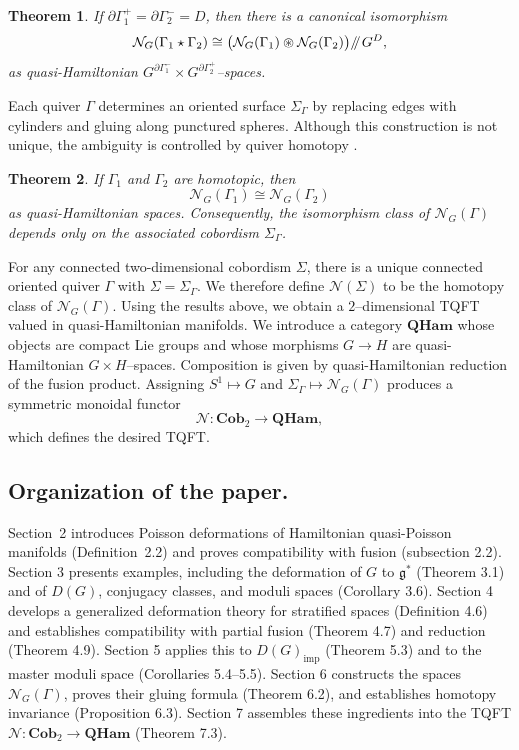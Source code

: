 \documentclass[reqno]{amsart}
\theoremstyle{plain}
\newtheorem{Thm}{Theorem}[section]
\theoremstyle{definition}
\newcommand{\sll}[1]{\mkern-4mu\mathbin{/\mkern-5mu/}_{\mkern-4mu{#1}}}
\begin{document}
\begin{Thm}
If $\partial\Gamma_{1}^{+}=\partial\Gamma_{2}^{-}=D$, then there is a canonical isomorphism
\[
\mathcal{N}_{G}(\Gamma_{1}\star\Gamma_{2})
\cong
\bigl(\mathcal{N}_{G}(\Gamma_{1})\circledast\mathcal{N}_{G}(\Gamma_{2})\bigr)\sll{} G^{D},
\]
as quasi-Hamiltonian $G^{\partial\Gamma_{1}^{-}}\times G^{\partial\Gamma_{2}^{+}}$--spaces.
\end{Thm}

Each quiver $\Gamma$ determines an oriented surface $\Sigma_{\Gamma}$ by replacing edges with cylinders and gluing along punctured spheres. Although this construction is not unique, the ambiguity is controlled by quiver homotopy \cite[Definition~6.1, Proposition~6.2]{maiza2025lax}.

\begin{Thm}
If $\Gamma_{1}$ and $\Gamma_{2}$ are homotopic, then
\[
\mathcal{N}_{G}(\Gamma_{1})\cong \mathcal{N}_{G}(\Gamma_{2})
\]
as quasi-Hamiltonian spaces. Consequently, the isomorphism class of $\mathcal{N}_{G}(\Gamma)$ depends only on the associated cobordism $\Sigma_{\Gamma}$.
\end{Thm}

For any connected two-dimensional cobordism $\Sigma$, there is a unique connected oriented quiver $\Gamma$ with $\Sigma=\Sigma_{\Gamma}$. We therefore define $\mathcal{N}(\Sigma)$ to be the homotopy class of $\mathcal{N}_{G}(\Gamma)$. Using the results above, we obtain a $2$--dimensional TQFT valued in quasi-Hamiltonian manifolds. We introduce a category $\mathbf{QHam}$ whose objects are compact Lie groups and whose morphisms $G\to H$ are quasi-Hamiltonian $G\times H$--spaces. Composition is given by quasi-Hamiltonian reduction of the fusion product. Assigning $S^{1}\mapsto G$ and $\Sigma_{\Gamma}\mapsto\mathcal{N}_{G}(\Gamma)$ produces a symmetric monoidal functor
\[
\mathcal{N}:\mathbf{Cob}_{2}\longrightarrow\mathbf{QHam},
\]
which defines the desired TQFT.

\subsection*{Organization of the paper.}
Section~2 introduces Poisson deformations of Hamiltonian quasi-Poisson manifolds (Definition~2.2) and proves compatibility with fusion (subsection 2.2). Section 3 presents examples, including the deformation of $G$ to $\mathfrak{g}^{*}$ (Theorem 3.1) and of $D(G)$, conjugacy classes, and moduli spaces (Corollary 3.6). Section 4 develops a generalized deformation theory for stratified spaces (Definition 4.6) and establishes compatibility with partial fusion (Theorem 4.7) and reduction (Theorem 4.9). Section 5 applies this to $D(G)_{\mathrm{imp}}$ (Theorem 5.3) and to the master moduli space (Corollaries 5.4--5.5). Section 6 constructs the spaces $\mathcal{N}_{G}(\Gamma)$, proves their gluing formula (Theorem 6.2), and establishes homotopy invariance (Proposition 6.3). Section 7 assembles these ingredients into the TQFT $\mathcal{N}:\mathbf{Cob}_{2}\to\mathbf{QHam}$ (Theorem 7.3).
\end{document}
